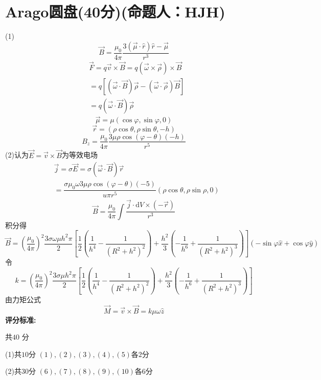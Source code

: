 \documentclass{article}
\begin{document}
\section*{Arago圆盘(40分)(命题人：HJH)}
\[\]
(1)
\[
\vec{B }=\dfrac{\mu _{0}}{4\pi }\dfrac{3\left( \vec{\mu }\cdot \hat{r}\right) \hat{r}-\vec{\mu }}{r^{3}}
\tag{1}\]
\[
\begin{aligned}
&\vec{F}=q\vec{v}\times\vec{B}=q(\vec{\omega}\times\vec{\rho})\times\vec{B}\\
&=q\left[\left(\vec{\omega}\cdot\vec{B}\right)\vec{\rho}-\left(\vec{\omega}\cdot\vec{\rho}\right)\vec{B}\right]\\
&=q\left(\vec{\omega}\cdot\vec{B}\right)\vec{\rho}
\end{aligned}
\tag{2}\]
\[
\vec{\mu}=\mu\left(\cos \varphi,\sin \varphi,0\right)
\tag{3}\]
\[
\vec{r}=\left(\rho\cos\theta,\rho\sin\theta,-h\right)
\tag{4}\]
\[
B_z=\frac{\mu_0}{4\pi}\frac{3\mu\rho\cos(\varphi-\theta)(-h)}{r^5}
\tag{5}\]
(2)认为$\vec{E}=\vec{v}\times\vec{B}$为等效电场
\[
\begin{aligned}
&\vec{j}=\sigma\vec{E}=\sigma(\vec{\omega}\cdot\vec{B})\vec{r}   \\
&=\dfrac{\sigma\mu_0\omega3\mu\rho\cos(\varphi-\theta)(-5)}{u\pi r^5}(\rho \cos\theta,\rho\sin \rho,0)
\end{aligned}
\tag{6}\]
\[
\vec{B}=\frac{\mu_0}{4\pi}\int\dfrac{\vec{j}\cdot\mathrm{d}V\times(-\vec{r})}{r^3}
\tag{7}\]
积分得
\[
\vec{B}=\left(\dfrac{\mu_0}{4\pi}\right)^2\frac{3\sigma\omega\mu h^2\pi}{2}\left[\dfrac{1}{2}\left(\dfrac{1}{h^4}-\dfrac{1}{\left(R^2+h^2\right)^2}\right)+\dfrac{h^2}{3}\left(-\dfrac{1}{h^6}+\dfrac{1}{\left(R^2+h^2\right)^3}\right)\right](-\sin\varphi \hat{x}+\cos \varphi \hat{y})
\tag{8}\]
令
\[
k=\left(\dfrac{\mu_0}{4\pi}\right)^2\frac{3\sigma\mu h^2\pi}{2}\left[\dfrac{1}{2}\left(\dfrac{1}{h^4}-\dfrac{1}{\left(R^2+h^2\right)^2}\right)+\dfrac{h^2}{3}\left(-\dfrac{1}{h^6}+\dfrac{1}{\left(R^2+h^2\right)^3}\right)\right]
\tag{9}\]
由力矩公式
\[
\vec{M}=\vec{v}\times\vec{B}=k\mu\omega\hat{z}
\tag{10}\]
\textbf{评分标准:}\par
共$40$ 分\par
(1)共$10$分 $(1),(2),(3),(4),(5)$各$2$分\par
(2)共$30$分 $(6),(7),(8),(9),(10)$各$6$分\par
\end{document}
